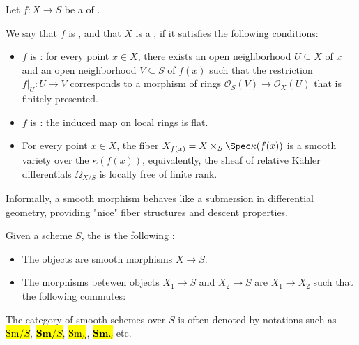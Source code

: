\begin{definition} \label{definition:smooth_morphism_of_schemes}
Let \(f: X \to S\) be a  of .

We say that \(f\) is , and that $X$ is a , if it satisfies the following conditions:

\begin{itemize}
    \item \(f\) is : for every point \(x \in X\), there exists an open neighborhood \(U \subseteq X\) of \(x\) and an open neighborhood \(V \subseteq S\) of \(f(x)\) such that the restriction \(f|_U : U \to V\) corresponds to a morphism of rings \( \mathcal{O}_S(V) \to \mathcal{O}_X(U) \) that is finitely presented.
    
    \item \(f\) is : the induced map on local rings is flat.
    
    \item For every point \(x \in X\), the fiber \(X_{f(x)} = X \times_S \Spec \kappa(f(x))\) is a smooth variety over the  \(\kappa(f(x))\), equivalently, the sheaf of relative Kähler differentials \(\Omega_{X/S}\) is locally free of finite rank.

\end{itemize}

Informally, a smooth morphism behaves like a submersion in differential geometry, providing "nice" fiber structures and descent properties.

Given a scheme $S$, the  is the following  :
\begin{itemize}
    \item The objects are smooth morphisms $X \to S$. 
    \item The morphisms betewen objects $X_1 \to S$ and $X_2 \to S$ are  $X_1 \to X_2$ such that the following commutes:
    \begin{center}
    \end{center}
\end{itemize}
The category of smooth schemes over $S$ is often denoted by notations such as \hl{$\mathrm{Sm}/S$}, \hl{$\mathbf{Sm}/S$}, \hl{$\mathrm{Sm}_S$}, \hl{$\mathbf{Sm}_S$} etc.

\end{definition}